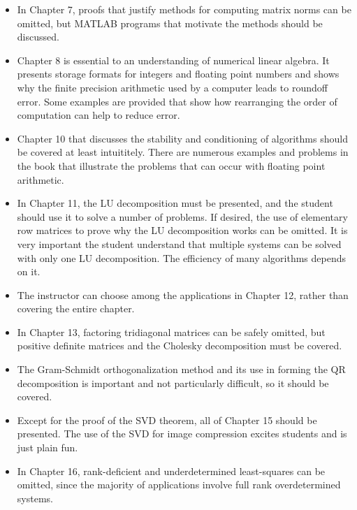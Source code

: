 \documentclass[../main.tex]{subfiles}
\begin{document}
\begin{itemize}[noitemsep]
	
	\item  In Chapter 7, proofs that justify methods for computing matrix norms can be omitted, but MATLAB programs that motivate the methods should be discussed.

	\item Chapter 8 is essential to an understanding of numerical linear algebra. It presents storage formats for integers and floating point numbers and shows why the finite precision arithmetic used by a computer leads to roundoff error. Some examples are provided that show how rearranging the order of computation can help to reduce error.
	
	\item Chapter 10 that discusses the stability and conditioning of algorithms should be covered at least intuititely. There are numerous examples and problems in the book that illustrate the problems that can occur with floating point arithmetic.
	
	\item In Chapter 11, the LU decomposition must be presented, and the student should use it to solve a number of problems. If desired, the use of elementary row matrices to prove why the LU decomposition works can be omitted. It is very important the student understand that multiple systems can be solved with only one LU decomposition. The efficiency of many algorithms depends on it.
	
	\item The instructor can choose among the applications in Chapter 12, rather than covering the entire chapter.

	\item In Chapter 13, factoring tridiagonal matrices can be safely omitted, but positive definite matrices and the Cholesky decomposition must be covered.

	\item The Gram-Schmidt orthogonalization method and its use in forming the QR decomposition is important and not particularly difficult, so it should be covered.

	\item  Except for the proof of the SVD theorem, all of Chapter 15 should be presented. The use of the SVD for image compression excites students and is just plain fun.
	
	\item In Chapter 16, rank-deficient and underdetermined least-squares can be omitted, since the majority of applications involve full rank overdetermined systems.


\end{itemize}
\end{document}
